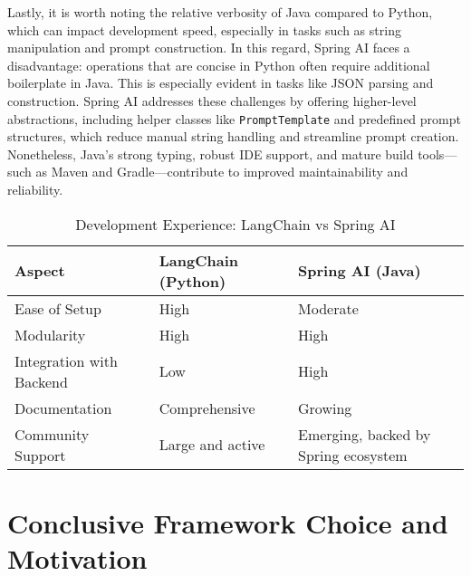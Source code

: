 Lastly, it is worth noting the relative verbosity of Java compared to Python, which can impact development speed, especially in tasks such as string manipulation and prompt construction. In this regard, Spring AI faces a disadvantage: operations that are concise in Python often require additional boilerplate in Java. This is especially evident in tasks like JSON parsing and construction. Spring AI addresses these challenges by offering higher-level abstractions, including helper classes like \texttt{PromptTemplate} and predefined prompt structures, which reduce manual string handling and streamline prompt creation. Nonetheless, Java's strong typing, robust IDE support, and mature build tools—such as Maven and Gradle—contribute to improved maintainability and reliability.

\begin{table}[htbp]
\caption{Development Experience: LangChain vs Spring AI}
\begin{center}
\renewcommand{\arraystretch}{1.2}
\begin{tabularx}{\linewidth}{|l|X|X|}
\hline
\textbf{Aspect} & \textbf{LangChain (Python)} & \textbf{Spring AI (Java)} \\
\hline
Ease of Setup & High & Moderate \\
\hline
Modularity & High & High \\
\hline
Integration with Backend & Low & High \\
\hline
Documentation  & Comprehensive & Growing \\
\hline
Community Support & Large and active & Emerging, backed by Spring ecosystem \\
\hline
\end{tabularx}
\label{tab:dev_results}
\end{center}
\end{table}




\section*{Conclusive Framework Choice and Motivation}

